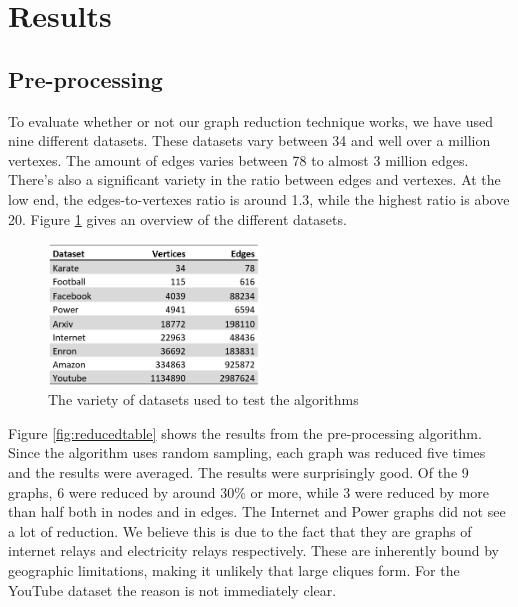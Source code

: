 \section{Results}
\label{chapter:results}
\subsection{Pre-processing}
To evaluate whether or not our graph reduction technique works, we have used nine different datasets. These datasets vary between 34 and well over a million vertexes. The amount of edges varies between 78 to almost 3 million edges. There's also a significant variety in the ratio between edges and vertexes. At the low end, the edges-to-vertexes ratio is around 1.3, while the highest ratio is above 20. Figure \ref{fig:datasets} gives an overview of the different datasets.

\begin{figure}[H]
\begin{center}
\includegraphics[width=0.5\textwidth]{images/datasets.png}
\caption{The variety of datasets used to test the algorithms}\label{fig:datasets}
\end{center}
\end{figure}

Figure \ref{fig:reducedtable} shows the results from the pre-processing algorithm. Since the algorithm uses random sampling, each graph was reduced five times and the results were averaged. The results were surprisingly good. Of the 9 graphs, 6 were reduced by around 30\% or more, while 3 were reduced by more than half both in nodes and in edges. The Internet and Power graphs did not see a lot of reduction. We believe this is due to the fact that they are graphs of internet relays and electricity relays respectively. These are inherently bound by geographic limitations, making it unlikely that large cliques form. For the YouTube dataset the reason is not immediately clear.

